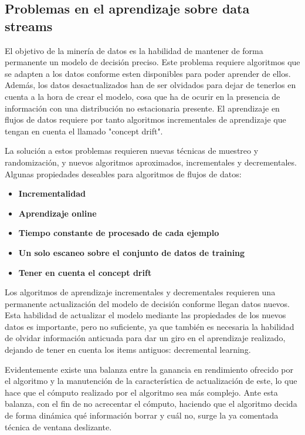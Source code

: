 \subsection{Problemas en el aprendizaje sobre data streams}

El objetivo de la minería de datos es la habilidad de mantener de forma permanente un modelo de decisión preciso.
Este problema requiere algoritmos que se adapten a los datos conforme esten disponibles para poder aprender de ellos.
Además, los datos desactualizados han de ser olvidados para dejar de tenerlos en cuenta a la hora de crear el modelo, cosa que ha de ocurir en la presencia de 
información con una distribución no estacionaria presente. El aprendizaje en flujos de datos requiere por tanto algoritmos incrementales de aprendizaje que tengan en
cuenta el llamado "concept drift".

La solución a estos problemas requieren nuevas técnicas de muestreo y randomización, y nuevos algoritmos aproximados, incrementales y decrementales.
Algunas propiedades deseables para algoritmos de flujos de datos:
\begin{itemize}
	\item \textbf{Incrementalidad}
	\item \textbf{Aprendizaje online}
	\item \textbf{Tiempo constante de procesado de cada ejemplo}
	\item \textbf{Un solo escaneo sobre el conjunto de datos de training}
	\item \textbf{Tener en cuenta el concept drift}
\end{itemize}


Los algoritmos de aprendizaje incrementales y decrementales requieren una permanente actualización del modelo de decisión conforme llegan datos nuevos. Esta habilidad 
de actualizar el modelo mediante las propiedades de los nuevos datos es importante, pero no suficiente, ya que también es necesaria la habilidad de olvidar información
anticuada para dar un giro en el aprendizaje realizado, dejando de tener en cuenta los items antiguos: decremental learning.

Evidentemente existe una balanza entre la ganancia en rendimiento ofrecido por el algoritmo y la manutención de la característica de actualización de este, lo que hace que 
el cómputo realizado por el algoritmo sea más complejo. Ante esta balanza, con el fin de no acrecentar el cómputo, haciendo que el algoritmo decida de forma dinámica
qué información borrar y cuál no, surge la ya comentada técnica de ventana deslizante.

